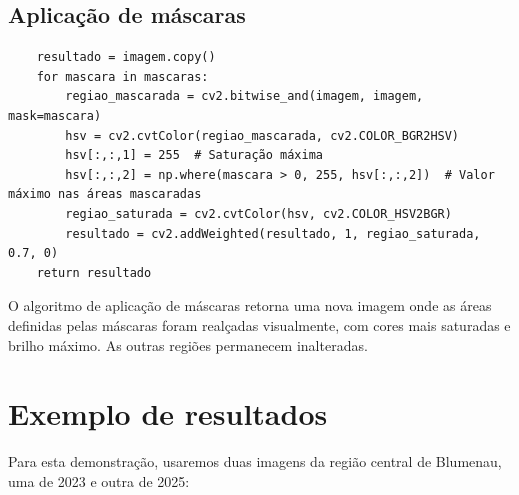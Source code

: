 \documentclass{article}
\begin{document}
\subsection{Aplicação de máscaras}

\begin{verbatim}
    resultado = imagem.copy()
    for mascara in mascaras:
        regiao_mascarada = cv2.bitwise_and(imagem, imagem, mask=mascara)
        hsv = cv2.cvtColor(regiao_mascarada, cv2.COLOR_BGR2HSV)
        hsv[:,:,1] = 255  # Saturação máxima
        hsv[:,:,2] = np.where(mascara > 0, 255, hsv[:,:,2])  # Valor máximo nas áreas mascaradas
        regiao_saturada = cv2.cvtColor(hsv, cv2.COLOR_HSV2BGR)
        resultado = cv2.addWeighted(resultado, 1, regiao_saturada, 0.7, 0)
    return resultado
\end{verbatim}

O algoritmo de aplicação de máscaras retorna uma nova imagem onde as áreas definidas pelas máscaras foram realçadas visualmente, com cores mais saturadas e brilho máximo. As outras regiões permanecem inalteradas.

\section{Exemplo de resultados}

Para esta demonstração, usaremos duas imagens da região central de Blumenau, uma de 2023 e outra de 2025:
\end{document}
